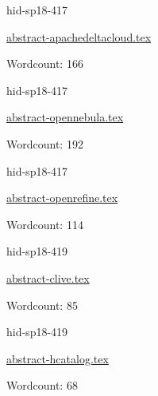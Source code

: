 

\begin{IU}

hid-sp18-417

\href{https://github.com/cloudmesh-community/hid-sp18-417/blob/master//technology/abstract-apachedeltacloud.tex}{abstract-apachedeltacloud.tex}

 

Wordcount: 166

\end{IU}



\begin{IU}

hid-sp18-417

\href{https://github.com/cloudmesh-community/hid-sp18-417/blob/master//technology/abstract-opennebula.tex}{abstract-opennebula.tex}

 

Wordcount: 192

\end{IU}



\begin{IU}

hid-sp18-417

\href{https://github.com/cloudmesh-community/hid-sp18-417/blob/master//technology/abstract-openrefine.tex}{abstract-openrefine.tex}

 

Wordcount: 114

\end{IU}



\begin{IU}

hid-sp18-419

\href{https://github.com/cloudmesh-community/hid-sp18-419/blob/master//technology/abstract-clive.tex}{abstract-clive.tex}

 

Wordcount: 85

\end{IU}



\begin{IU}

hid-sp18-419

\href{https://github.com/cloudmesh-community/hid-sp18-419/blob/master//technology/abstract-hcatalog.tex}{abstract-hcatalog.tex}

 

Wordcount: 68

\end{IU}

